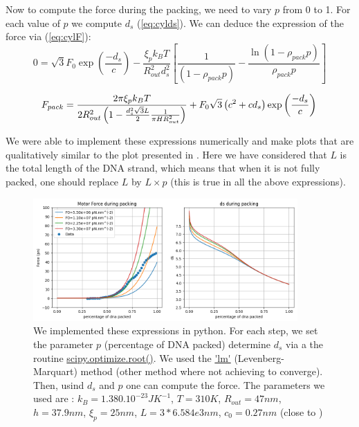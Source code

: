 \documentclass{article}
\begin{document}
Now to compute the force during the packing, we need to vary $p$ from 0 to 1. For each value of $p$ we compute $d_s$ (\ref{eq:cylds}). We can deduce the expression of the force via (\ref{eq:cylF}):
\begin{equation}
    0 = \sqrt{3} F_0 \exp \left( \frac{-d_s}{c} \right) - \frac{\xi_p k_B T}{R_{out}^2 d_s^2} \left[ \frac{1}{ \left( 1 - \rho_{pack} p\right)} - \frac{\ln \left( 1-\rho_{pack}p \right) }{\rho_{pack} p} \right] 
    \label{eq:cylds}
\end{equation}

\begin{equation}
    F_{pack} = \frac{2 \pi \xi_p k_B T}{2 R_{out}^2 \left( 1 - \frac{d_s^2 \sqrt{3} L}{2} \frac{1}{\pi H R_{out}^2}\right) } + F_0 \sqrt{3} \left( c^2 + cd_s \right) \exp \left( \frac{-d_s}{c} \right) \\
    \label{eq:cylF}
\end{equation}

We were able to implement these expressions numerically and make plots that are qualitatively similar to the plot presented in \cite{purohit2003}. Here we have considered that $L$ is the total length of the DNA strand, which means that when it is not fully packed, one should replace $L$ by $L\times p$ (this is true in all the above expressions).

\begin{figure}
    \centering
    \includegraphics[width=0.9\textwidth]{Plot_ofTheForce_Cyl.png}
    \caption{We implemented these expressions in python. For each step, we set the parameter $p$ (percentage of DNA packed) determine $d_s$ via a the routine \url{scipy.optimize.root()}. We used the \url{'lm'} (Levenberg-Marquart) method (other method where not achieving to converge). Then, usind $d_s$ and $p$ one can compute the force. The parameters we used are : $k_B=1.380.10^{-23}JK^{-1}$, $T=310 K$, $R_{out} = 47 nm$, $h = 37.9 nm$, $ \xi_p = 25 nm$, $L = 3*6.584e3 nm$, $c_0 = 0.27 nm$ (close to \cite{purohit2003})}
    \label{fig:dseqcyl}
\end{figure}
\end{document}
